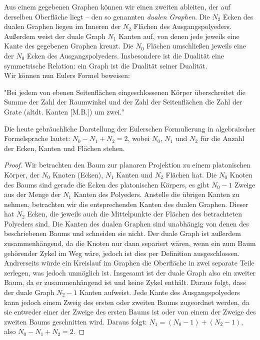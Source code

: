 Aus einem gegebenen Graphen können wir einen zweiten ableiten, der auf derselben Oberfläche liegt -- den so genannten \textit{dualen Graphen}.
Die $N_2$ Ecken des dualen Graphen liegen im Inneren der $N_2$ Flächen des Ausgangspolyeders. Außerdem weist der duale Graph $N_1$ Kanten auf, von denen jede jeweils eine Kante des gegebenen Graphen kreuzt. Die $N_0$ Flächen umschließen jeweils eine der $N_0$ Ecken des Ausgangspolyeders. Insbesondere ist die Dualität eine symmetrische Relation: ein Graph ist die Dualität seiner Dualität.\\
Wir können nun Eulers Formel beweisen:
\begin{theorem}
"Bei jedem von ebenen Seitenflächen eingeschlossenen Körper überschreitet die Summe der Zahl der Raumwinkel und der Zahl der Seitenflächen die Zahl der Grate (altdt. Kanten [M.B.]) um zwei."
\end{theorem}
Die heute gebräuchliche Darstellung der Eulerschen Formulierung in algebraischer Formelsprache lautet:
$N_0 - N_1 + N_2 =2 $, wobei $N_0$, $N_1$ und $N_2$ für die Anzahl der Ecken, Kanten und Flächen stehen.
\begin{proof}
Wir betrachten den Baum zur planaren Projektion zu einem platonischen Körper, der $N_0$ Knoten (Ecken), $N_1$ Kanten und $N_2$ Flächen hat. Die $N_0$ Knoten des Baums sind gerade die Ecken des platonischen Körpers, es gibt $N_0 -1$ Zweige aus der Menge der $N_1$ Kanten des Polyeders. Anstelle die übrigen Kanten zu nehmen, betrachten wir die entsprechenden Kanten des dualen Graphen. Dieser hat $N_2$ Ecken, die jeweils auch die Mittelpunkte der Flächen des betrachteten Polyeders sind. Die Kanten des dualen Graphen sind unabhängig von denen des beschriebenen Baums und schneiden sie nicht. Der duale Graph ist außerdem zusammenhängend, da die Knoten nur dann separiert wären, wenn ein zum Baum gehörender Zykel im Weg wäre, jedoch ist dies per Definition ausgeschlossen. Andrerseits würde ein Kreislauf im Graphen die Oberfläche in zwei separate Teile zerlegen, was jedoch unmöglich ist. Insgesamt ist der duale Graph also ein zweiter Baum, da er zusammenhängend ist und keine Zykel enthält. Daraus folgt, dass der duale Graph $N_2-1$ Kanten aufweist. Jede Kante des Ausgangspolyeders kann jedoch einem Zweig des ersten oder zweiten Baums zugeordnet werden, da sie entweder einer der Zweige des ersten Baums ist oder von einem der Zweige des zweiten Baums geschnitten wird. Daraus folgt: $N_1 = (N_0-1) + (N_2-1)$, also $N_0 - N_1 + N_2 =2 $.
\end{proof}
